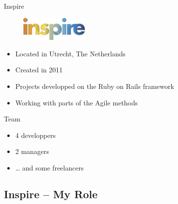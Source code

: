 \documentclass[10pt,a4paper]{beamer}
\begin{document}
\begin{frame}{Inspire}

  \begin{figure}[htp]
  \centering
  \includegraphics[width=0.3\textwidth]{../img/logo.png}
  \end{figure}

  \begin{itemize}
    \item Located in Utrecht, The Netherlands
    \item Created in 2011
    \item Projects developped on the Ruby on Rails framework
    \item Working with parts of the Agile methods
  \end{itemize}
  
  \begin{block}{Team}
    \begin{itemize}
      \item 4 developpers
      \item 2 managers
      \item … and some freelancers
    \end{itemize}
  \end{block}
\end{frame}

\subsection{Inspire -- My Role}
\end{document}
